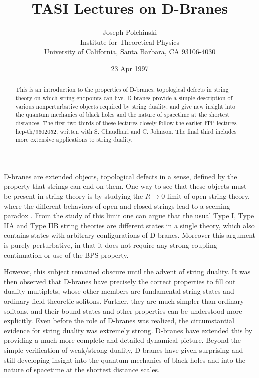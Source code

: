 \documentclass[12pt]{article}
\begin{document}
\date{23 Apr 1997}
\title{TASI Lectures on D-Branes}
\author{Joseph Polchinski \\
Institute for Theoretical Physics\\
University of California, Santa Barbara, CA 93106-4030}

\maketitle

\begin{abstract}
This is an introduction to the properties of D-branes, topological defects in
string theory on which string endpoints can live.  D-branes provide a simple
description of various nonperturbative objects required by string duality,
and give new insight into the quantum mechanics of black holes and the nature
of spacetime at the shortest distances.
The first two thirds of these lectures
closely follow the earlier ITP lectures hep-th/9602052, written with S.
Chaudhuri and C. Johnson.  The final third includes more extensive
applications to string duality.
\end{abstract}

\newpage
  
D-branes are extended objects, topological defects in a sense, defined by the
property that strings can end on them.  One way to see that these objects 
must be present in string theory is by studying the
$R \to 0$ limit of open string theory, where the different behaviors of open
and closed strings lead to a seeming paradox \cite{dlp}. From the study of
this limit one can argue that the usual Type I, Type IIA and Type IIB string
theories are different states in a single theory, which also contains states
with arbitrary configurations of D-branes.  Moreover this argument is purely
perturbative, in that it does not require any strong-coupling continuation or
use of the BPS property.  

However, this subject remained obscure until the advent of string duality.  It
was then observed that D-branes have precisely the correct properties to fill
out duality multiplets, \cite{joeone} whose other members are fundamental string
states and ordinary field-theoretic solitons.  Further, they are much simpler
than ordinary solitons, and their bound states and other properties can be
understood more explicitly.  Even before the role of D-branes was
realized, the circumstantial evidence for string duality was 
extremely strong.  D-branes have extended this by providing a much more
complete and detailed dynamical picture.
Beyond the simple verification of weak/strong duality, D-branes have given
surprising and still developing insight into the quantum mechanics of black
holes and into the nature of spacetime at the shortest distance scales.
\end{document}
